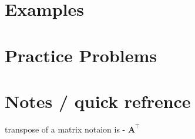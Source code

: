 \documentclass{article}
\begin{document}
\section{Examples}

\section{Practice Problems}


\section{Notes / quick refrence}
transpose of a matrix notaion is - $\mathbf{A}^\intercal$\
\end{document}
